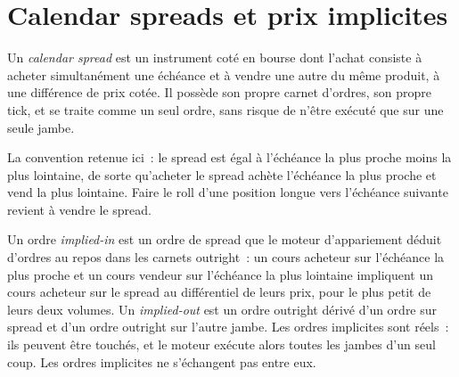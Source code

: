 \section{Calendar spreads et prix implicites}

\begin{definition}\label{def:m1:matching-algorithms-and-implied-spreads:calendar}
Un \emph{calendar spread} est un instrument coté en bourse
dont l'achat consiste à acheter simultanément une échéance et à vendre une autre
du même produit, à une différence de prix cotée. Il possède
son propre carnet d'ordres, son propre tick, et se traite comme un seul ordre, sans risque
de n'être exécuté que sur une seule jambe.
\end{definition}

La convention retenue ici~: le spread est égal à l'échéance la plus proche moins
la plus lointaine, de sorte qu'acheter le spread achète l'échéance la plus proche et vend la plus lointaine. Faire le roll d'une position longue
vers l'échéance suivante revient à vendre le spread.

\begin{definition}\label{def:m1:matching-algorithms-and-implied-spreads:implied}
Un ordre \emph{implied-in} est un ordre de spread que le
moteur d'appariement déduit d'ordres au repos dans les carnets outright~: un cours acheteur
sur l'échéance la plus proche et un cours vendeur sur l'échéance la plus lointaine impliquent un cours acheteur sur le spread
au différentiel de leurs prix, pour le plus petit de leurs deux volumes. Un
\emph{implied-out} est un ordre outright dérivé d'un
ordre sur spread et d'un ordre outright sur l'autre jambe. Les ordres implicites sont
réels~: ils peuvent être touchés, et le moteur exécute alors toutes les jambes d'un seul coup.
Les ordres implicites ne s'échangent pas entre eux.
\end{definition}

